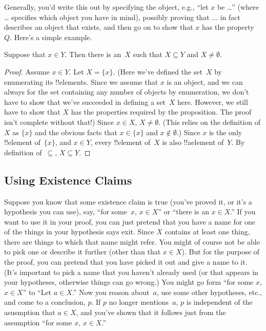\documentclass[../../../include/open-logic-section]{subfiles}
\begin{document}
Generally, you'd write this out by specifying the object, e.g., ``let
$x$ be \dots'' (where \dots{} specifies which object you have in
mind), possibly proving that $\dots$ in fact describes an object that
exists, and then go on to show that $x$ has the property~$Q$. Here's a
simple example.

\begin{prop}
  Suppose that $x \in Y$. Then there is an~$X$ such that $X \subseteq
  Y$ and $X \neq \emptyset$.
\end{prop}

\begin{proof}
  Assume $x \in Y$. Let $X = \{x\}$. (Here we've defined the set~$X$
  by enumerating its !!{element}s. Since we assume that $x$ is an
  object, and we can always for the set containing any number of
  objects by enumeration, we don't have to show that we've succeeded
  in defining a set~$X$ here.  However, we still have to show that $X$
  has the properties required by the proposition. The proof isn't
  complete without that!) Since $x \in X$, $X \neq \emptyset$. (This
  relies on the definition of $X$ as $\{x\}$ and the obvious facts
  that $x \in \{x\}$ and $x \notin \emptyset$.) Since $x$ is the only
  !!{element} of~$\{x\}$, and $x \in Y$, every !!{element} of~$X$ is
  also !!a{element} of~$Y$. By definition of~$\subseteq$, $X \subseteq
  Y$.
\end{proof}

\subsection{Using Existence Claims}

Suppose you know that some existence claim is true (you've proved it,
or it's a hypothesis you can use), say, ``for some~$x$, $x \in X$'' or
``there is an $x \in X$.''  If you want to use it in your proof, you
can just pretend that you have a name for one of the things in your
hypothesis says exit. Since $X$ contains at least one thing, there are
things to which that name might refer. You might of course not be able
to pick one or describe it further (other than that $x \in X$). But
for the purpose of the proof, you can pretend that you have picked it
out and give a name to it. (It's important to pick a name that you
haven't already used (or that appears in your hypotheses, otherwise
things can go wrong.) You might go form ``for some $x$, $x \in X$''
to ``Let $a \in X$.''  Now you reason about~$a$, use some other
hypotheses, etc., and come to a conclusion, $p$. If $p$ no longer
mentions~$a$, $p$ is independent of the asusmption that $a \in X$, and
you've shown that it follows just from the assumption ``for some $x$,
$x \in X$.''
\end{document}
